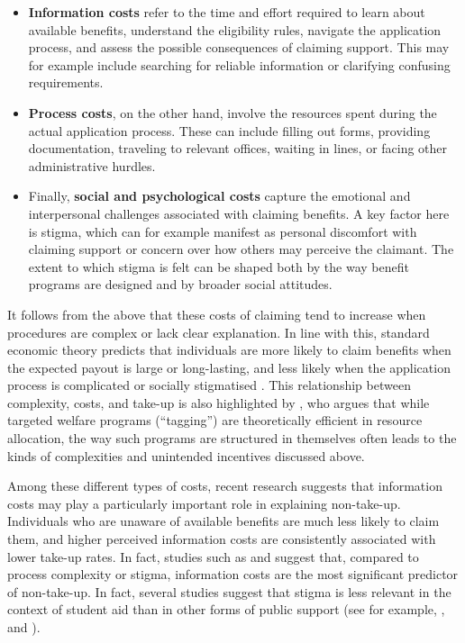\begin{itemize}
  \item \textbf{Information costs} refer to the time and effort required to learn about available benefits, understand the eligibility rules, navigate the application process, and assess the possible consequences of claiming support. This may for example include searching for reliable information or clarifying confusing requirements.
  \item \textbf{Process costs}, on the other hand, involve the resources spent during the actual application process. These can include filling out forms, providing documentation, traveling to relevant offices, waiting in lines, or facing other administrative hurdles.
  \item Finally, \textbf{social and psychological costs} capture the emotional and interpersonal challenges associated with claiming benefits. A key factor here is stigma, which can for example manifest as personal discomfort with claiming support or concern over how others may perceive the claimant. The extent to which stigma is felt can be shaped both by the way benefit programs are designed and by broader social attitudes.
\end{itemize}

It follows from the above that these costs of claiming tend to increase when procedures are complex or lack clear explanation. In line with this, standard economic theory predicts that individuals are more likely to claim benefits when the expected payout is large or long-lasting, and less likely when the application process is complicated or socially stigmatised \citep{janssens_totake_2022, booij_role_2012}. This relationship between complexity, costs, and take-up is also highlighted by \cite{akerlof_tagging_1978}, who argues that while targeted welfare programs (“tagging”) are theoretically efficient in resource allocation, the way such programs are structured in themselves often leads to the kinds of complexities and unintended incentives discussed above.

Among these different types of costs, recent research suggests that information costs may play a particularly important role in explaining non-take-up. Individuals who are unaware of available benefits are much less likely to claim them, and higher perceived information costs are consistently associated with lower take-up rates. In fact, studies such as \cite{bolland_information_nodate} and \cite{currie_takeup_2004} suggest that, compared to process complexity or stigma, information costs are the most significant predictor of non-take-up. In fact, several studies suggest that stigma is less relevant in the context of student aid than in other forms of public support (see for example, \cite{konijn_quantifying_2023}, \cite{currie_takeup_2004} and \cite{bruckmeier_new_2012}).

